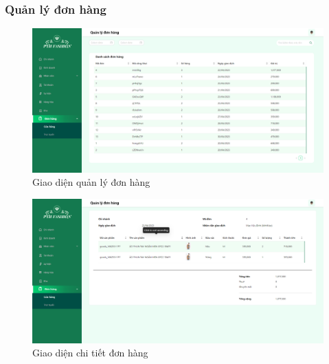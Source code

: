 \subsubsection{Quản lý đơn hàng}
\begin{figure}[!htp]
    \centering
    \includegraphics[width=12cm]{img/UI/admin_implement/order.png}
    \newline
    \caption{Giao diện quản lý đơn hàng}
\end{figure}

\begin{figure}[!htp]
    \centering
    \includegraphics[width=12cm]{img/UI/admin_implement/orderDetail.png}
    \newline
    \caption{Giao diện chi tiết đơn hàng}
\end{figure}

\newpage

